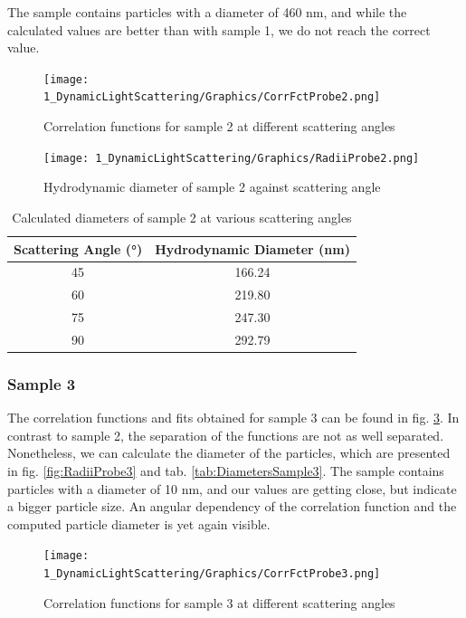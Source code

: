 \documentclass{article}
\begin{document}
The sample contains particles with a diameter of 460 nm, and while the calculated values are better than with sample 1, we do not reach the correct value.

\begin{figure}[!ht]
    \centering
    \texttt{[image: 1\_DynamicLightScattering/Graphics/CorrFctProbe2.png]}
    \caption{Correlation functions for sample 2 at different scattering angles}
    \label{fig:CorrFctProbe2}
\end{figure}
\FloatBarrier

\begin{figure}[!ht]
    \centering
    \texttt{[image: 1\_DynamicLightScattering/Graphics/RadiiProbe2.png]}
    \caption{Hydrodynamic diameter of sample 2 against scattering angle}
    \label{fig:RadiiProbe2}
\end{figure}
\FloatBarrier

\begin{table}[!ht]
    \centering
    \begin{tabular}{|c|c|}
    \hline
        Scattering Angle (°) & Hydrodynamic Diameter (nm) \\ \hline \hline
        45 & 166.24 \\ \hline
        60 & 219.80 \\ \hline
        75 & 247.30 \\ \hline
        90 & 292.79 \\ \hline
    \end{tabular}
    \caption{Calculated diameters of sample 2 at various scattering angles}
    \label{tab:DiametersSample2}
\end{table}

\subsubsection{Sample 3}
The correlation functions and fits obtained for sample 3 can be found in fig. \ref{fig:CorrFctProbe3}. In contrast to sample 2, the separation of the functions are not as well separated.
Nonetheless, we can calculate the diameter of the particles, which are presented in fig. \ref{fig:RadiiProbe3} and tab. \ref{tab:DiametersSample3}. The sample contains particles with a diameter of 10 nm, and our values are getting close, but indicate a bigger particle size.
An angular dependency of the correlation function and the computed particle diameter is yet again visible.

\begin{figure}[!ht]
    \centering
    \texttt{[image: 1\_DynamicLightScattering/Graphics/CorrFctProbe3.png]}
    \caption{Correlation functions for sample 3 at different scattering angles}
    \label{fig:CorrFctProbe3}
\end{figure}
\FloatBarrier
\end{document}
